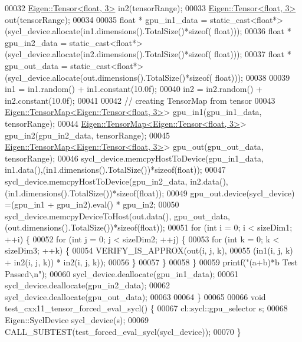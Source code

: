 \begin{DoxyCode}
00032   \hyperlink{class_eigen_1_1_tensor}{Eigen::Tensor<float, 3>} in2(tensorRange);
00033   \hyperlink{class_eigen_1_1_tensor}{Eigen::Tensor<float, 3>} out(tensorRange);
00034 
00035   \textcolor{keywordtype}{float} * gpu\_in1\_data  = \textcolor{keyword}{static\_cast<}\textcolor{keywordtype}{float}*\textcolor{keyword}{>}(sycl\_device.allocate(in1.dimensions().TotalSize()*\textcolor{keyword}{sizeof}(
      float)));
00036   \textcolor{keywordtype}{float} * gpu\_in2\_data  = \textcolor{keyword}{static\_cast<}\textcolor{keywordtype}{float}*\textcolor{keyword}{>}(sycl\_device.allocate(in2.dimensions().TotalSize()*\textcolor{keyword}{sizeof}(
      float)));
00037   \textcolor{keywordtype}{float} * gpu\_out\_data =  \textcolor{keyword}{static\_cast<}\textcolor{keywordtype}{float}*\textcolor{keyword}{>}(sycl\_device.allocate(out.dimensions().TotalSize()*\textcolor{keyword}{sizeof}(
      float)));
00038 
00039   in1 = in1.random() + in1.constant(10.0f);
00040   in2 = in2.random() + in2.constant(10.0f);
00041 
00042   \textcolor{comment}{// creating TensorMap from tensor}
00043   \hyperlink{class_eigen_1_1_tensor_map}{Eigen::TensorMap<Eigen::Tensor<float, 3>}> gpu\_in1(gpu\_in1\_data, 
      tensorRange);
00044   \hyperlink{class_eigen_1_1_tensor_map}{Eigen::TensorMap<Eigen::Tensor<float, 3>}> gpu\_in2(gpu\_in2\_data, 
      tensorRange);
00045   \hyperlink{class_eigen_1_1_tensor_map}{Eigen::TensorMap<Eigen::Tensor<float, 3>}> gpu\_out(gpu\_out\_data, 
      tensorRange);
00046   sycl\_device.memcpyHostToDevice(gpu\_in1\_data, in1.data(),(in1.dimensions().TotalSize())*\textcolor{keyword}{sizeof}(\textcolor{keywordtype}{float}));
00047   sycl\_device.memcpyHostToDevice(gpu\_in2\_data, in2.data(),(in1.dimensions().TotalSize())*\textcolor{keyword}{sizeof}(\textcolor{keywordtype}{float}));
00049   gpu\_out.device(sycl\_device) =(gpu\_in1 + gpu\_in2).eval() * gpu\_in2;
00050   sycl\_device.memcpyDeviceToHost(out.data(), gpu\_out\_data,(out.dimensions().TotalSize())*\textcolor{keyword}{sizeof}(\textcolor{keywordtype}{float}));
00051   \textcolor{keywordflow}{for} (\textcolor{keywordtype}{int} i = 0; i < sizeDim1; ++i) \{
00052     \textcolor{keywordflow}{for} (\textcolor{keywordtype}{int} j = 0; j < sizeDim2; ++j) \{
00053       \textcolor{keywordflow}{for} (\textcolor{keywordtype}{int} k = 0; k < sizeDim3; ++k) \{
00054         VERIFY\_IS\_APPROX(out(i, j, k),
00055                          (in1(i, j, k) + in2(i, j, k)) * in2(i, j, k));
00056       \}
00057     \}
00058   \}
00059   printf(\textcolor{stringliteral}{"(a+b)*b Test Passed\(\backslash\)n"});
00060   sycl\_device.deallocate(gpu\_in1\_data);
00061   sycl\_device.deallocate(gpu\_in2\_data);
00062   sycl\_device.deallocate(gpu\_out\_data);
00063 
00064 \}
00065 
00066 \textcolor{keywordtype}{void} test\_cxx11\_tensor\_forced\_eval\_sycl() \{
00067   cl::sycl::gpu\_selector s;
00068   Eigen::SyclDevice sycl\_device(s);
00069   CALL\_SUBTEST(test\_forced\_eval\_sycl(sycl\_device));
00070 \}
\end{DoxyCode}
